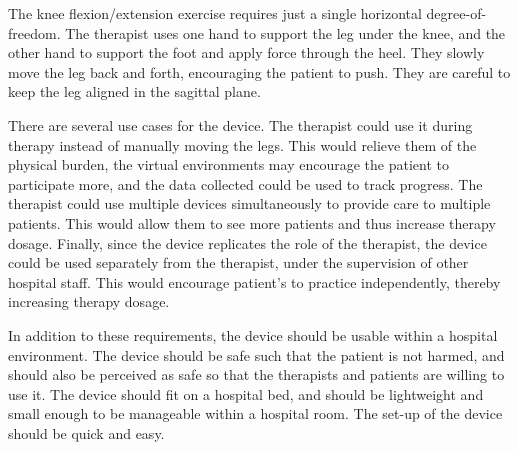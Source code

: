 \documentclass[12pt]{report}
\begin{document}
The knee flexion/extension exercise requires just a single horizontal degree-of-freedom. The therapist uses one hand to support the leg under the knee, and the other hand to support the foot and apply force through the heel. They slowly move the leg back and forth, encouraging the patient to push. They are careful to keep the leg aligned in the sagittal plane. 

There are several use cases for the device. The therapist could use it during therapy instead of manually moving the legs. This would relieve them of the physical burden, the virtual environments may encourage the patient to participate more, and the data collected could be used to track progress. The therapist could use multiple devices simultaneously to provide care to multiple patients. This would allow them to see more patients and thus increase therapy dosage. Finally, since the device replicates the role of the therapist, the device could be used separately from the therapist, under the supervision of other hospital staff. This would encourage patient's to practice independently, thereby increasing therapy dosage. 

In addition to these requirements, the device should be usable within a hospital environment. The device should be safe such that the patient is not harmed, and should also be perceived as safe so that the therapists and patients are willing to use it. The device should fit on a hospital bed, and should be lightweight and small enough to be manageable within a hospital room. The set-up of the device should be quick and easy.





\end{document}
